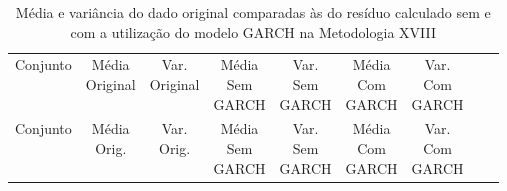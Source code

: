 \clearpage

\begin{center}
\begin{longtable}{ccccccccc}
\toprule
\rowcolor{white}
\caption[Metodologia XVIII: dados estatísticos]{Média e variância do dado original
comparadas às do resíduo calculado sem e com a utilização do modelo GARCH na
Metodologia XVIII} \label{tab:DadosEstatisticosMet18}\\
\midrule
    Conjunto & \specialcell{Média\\Original} &
    \specialcell{Var.\\Original} & \specialcell{Média\\Sem\\GARCH} &
    \specialcell{Var.\\Sem\\GARCH} & \specialcell{Média\\Com\\GARCH}&
    \specialcell{Var.\\Com\\GARCH} \\

\midrule
\endfirsthead 
\midrule
\rowcolor{white}
    Conjunto & \specialcell{Média\\Orig.} &
    \specialcell{Var.\\Orig.} & \specialcell{Média\\Sem\\GARCH} &
    \specialcell{Var.\\Sem\\GARCH} & \specialcell{Média\\Com\\GARCH}&
    \specialcell{Var.\\Com\\GARCH} \\


\end{longtable}
\end{center}
